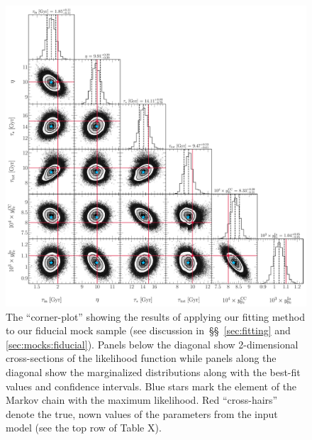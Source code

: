 \documentclass[ms.tex]{subfiles}
\begin{document}
\begin{figure}
\centering
\includegraphics[scale = 0.5]{fiducial_512k.pdf}
\caption{
The ``corner-plot'' showing the results of applying our fitting method to our
fiducial mock sample (see discussion in~\S\S~\ref{sec:fitting} and
\ref{sec:mocks:fiducial}).
Panels below the diagonal show 2-dimensional cross-sections of the likelihood
function while panels along the diagonal show the marginalized distributions
along with the best-fit values and confidence intervals.
Blue stars mark the element of the Markov chain with the maximum likelihood.
Red ``cross-hairs'' denote the true, nown values of the parameters from the
input model (see the top row of Table X).
}
\label{fig:fiducial_mock_corner}
\end{figure}
\end{document}
